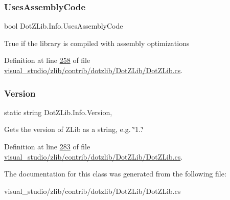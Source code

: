 \mbox{\label{class_dot_z_lib_1_1_info_a7fa48f081aa54199a54e4c00681c4040}} 
\subsubsection{\texorpdfstring{Uses\+Assembly\+Code}{UsesAssemblyCode}}
{\footnotesize\ttfamily bool Dot\+Z\+Lib.\+Info.\+Uses\+Assembly\+Code\hspace{0.3cm}{\ttfamily [get]}}



True if the library is compiled with assembly optimizations 



Definition at line \hyperlink{visual__studio_2zlib_2contrib_2dotzlib_2_dot_z_lib_2_dot_z_lib_8cs_source_l00258}{258} of file \hyperlink{visual__studio_2zlib_2contrib_2dotzlib_2_dot_z_lib_2_dot_z_lib_8cs_source}{visual\+\_\+studio/zlib/contrib/dotzlib/\+Dot\+Z\+Lib/\+Dot\+Z\+Lib.\+cs}.

\mbox{\label{class_dot_z_lib_1_1_info_a55b101b2c131860775880231fdf5fbd7}} 
\subsubsection{\texorpdfstring{Version}{Version}}
{\footnotesize\ttfamily static string Dot\+Z\+Lib.\+Info.\+Version\hspace{0.3cm}{\ttfamily [static]}, {\ttfamily [get]}}



Gets the version of Z\+Lib as a string, e.\+g. \char`\"{}1..\char`\"{} 



Definition at line \hyperlink{visual__studio_2zlib_2contrib_2dotzlib_2_dot_z_lib_2_dot_z_lib_8cs_source_l00283}{283} of file \hyperlink{visual__studio_2zlib_2contrib_2dotzlib_2_dot_z_lib_2_dot_z_lib_8cs_source}{visual\+\_\+studio/zlib/contrib/dotzlib/\+Dot\+Z\+Lib/\+Dot\+Z\+Lib.\+cs}.



The documentation for this class was generated from the following file\+:\begin{DoxyCompactItemize}
\item 
visual\+\_\+studio/zlib/contrib/dotzlib/\+Dot\+Z\+Lib/\+Dot\+Z\+Lib.\+cs\end{DoxyCompactItemize}
